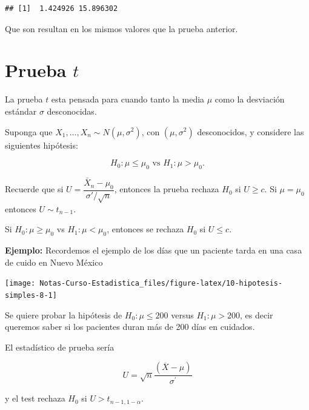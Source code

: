 \documentclass[
  12pt,
]{book}
\newenvironment{Shaded}{\begin{snugshade}}{\end{snugshade}}
\newcommand{\KeywordTok}[1]{\textcolor[rgb]{0.13,0.29,0.53}{\textbf{#1}}}
\newcommand{\NormalTok}[1]{#1}
\newcommand{\OperatorTok}[1]{\textcolor[rgb]{0.81,0.36,0.00}{\textbf{#1}}}
\newcommand{\StringTok}[1]{\textcolor[rgb]{0.31,0.60,0.02}{#1}}
\begin{document}
\begin{verbatim}
## [1]  1.424926 15.896302
\end{verbatim}

Que son resultan en los mismos valores que la prueba anterior.

\hypertarget{prueba-t}{%
\section{\texorpdfstring{Prueba \(t\)}{Prueba t}}\label{prueba-t}}

La prueba \(t\) esta pensada para cuando tanto la media \(\mu\) como la
desviación estándar \(\sigma\) desconocidas.

Suponga que \(X_1,\dots, X_n \sim N(\mu,\sigma^2)\), con \((\mu,\sigma^2)\)
desconocidos, y considere las siguientes hipótesis:

\[H_0: \mu\leq\mu_0 \text{ vs } H_1:\mu>\mu_0.\]

Recuerde que si \(U = \dfrac{\bar X_n -\mu_0}{\sigma' /\sqrt n}\), entonces la
prueba rechaza \(H_0\) si \(U\geq c\). Si \(\mu=\mu_0\) entonces \(U \sim t_{n-1}\).

Si \(H_0: \mu\geq\mu_0\) vs \(H_1: \mu<\mu_0\), entonces se rechaza \(H_0\) si \(U\leq c\).

\textbf{Ejemplo:} Recordemos el ejemplo de los días que un paciente tarda en una casa
de cuido en Nuevo México

\begin{Shaded}
\end{Shaded}

\begin{center}\texttt{[image: Notas-Curso-Estadistica\_files/figure-latex/10-hipotesis-simples-8-1]} \end{center}

Se quiere probar la hipótesis de \(H_{0}: \mu \leq 200\) versus \(H_{1}: \mu > 200\),
es decir queremos saber si los pacientes duran más de 200 días en cuidados.

El estadístico de prueba sería

\[
U =  \sqrt{n} \frac{(\overline{X} - \mu)}{\sigma ^{\prime}}
\]

y el test rechaza \(H_{0}\) si \(U>t_{n-1, 1-\alpha}\).
\end{document}

